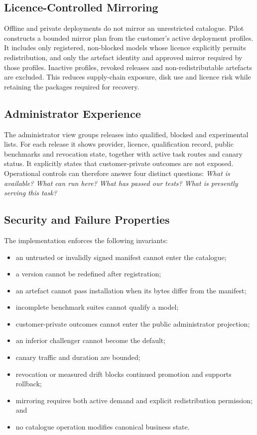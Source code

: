\subsection{Licence-Controlled Mirroring}

Offline and private deployments do not mirror an unrestricted catalogue.  Pilot constructs
a bounded mirror plan from the customer's active deployment profiles.  It includes only
registered, non-blocked models whose licence explicitly permits redistribution, and only
the artefact identity and approved mirror required by those profiles.  Inactive profiles,
revoked releases and non-redistributable artefacts are excluded.  This reduces supply-chain
exposure, disk use and licence risk while retaining the packages required for recovery.

\subsection{Administrator Experience}

The administrator view groups releases into qualified, blocked and experimental lists.
For each release it shows provider, licence, qualification record, public benchmarks and
revocation state, together with active task routes and canary status.  It explicitly states
that customer-private outcomes are not exposed.  Operational controls can therefore answer
four distinct questions: \emph{What is available?  What can run here?  What has passed our
tests?  What is presently serving this task?}

\subsection{Security and Failure Properties}

The implementation enforces the following invariants:
\begin{itemize}
  \item an untrusted or invalidly signed manifest cannot enter the catalogue;
  \item a version cannot be redefined after registration;
  \item an artefact cannot pass installation when its bytes differ from the manifest;
  \item incomplete benchmark suites cannot qualify a model;
  \item customer-private outcomes cannot enter the public administrator projection;
  \item an inferior challenger cannot become the default;
  \item canary traffic and duration are bounded;
  \item revocation or measured drift blocks continued promotion and supports rollback;
  \item mirroring requires both active demand and explicit redistribution permission; and
  \item no catalogue operation modifies canonical business state.
\end{itemize}

